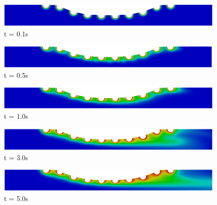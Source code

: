 \begin{figure}[H]
     \begin{minipage}{.50\linewidth}
      \centering
      \includegraphics[scale=0.18]{./02_chaps/cap_solution/figure/conc1_CurvedStrut1.png}\\
      t = 0.1s
     \end{minipage}%
     \begin{minipage}{.50\linewidth}
      \centering
      \includegraphics[scale=0.18]{./02_chaps/cap_solution/figure/conc1_CurvedStrut2.png}\\
      t = 0.5s
     \end{minipage}
     \begin{minipage}{.50\linewidth}
     \medskip
      \centering
      \includegraphics[scale=0.18]{./02_chaps/cap_solution/figure/conc1_CurvedStrut3.png}\\
      t = 1.0s
     \end{minipage}%
     \begin{minipage}{.50\linewidth}
     \medskip
      \centering
      \includegraphics[scale=0.18]{./02_chaps/cap_solution/figure/conc1_CurvedStrut4.png}\\
      t = 3.0s
     \end{minipage}
     \begin{minipage}{.50\linewidth}
      \centering
      \includegraphics[scale=0.18]{./02_chaps/cap_solution/figure/conc1_CurvedStrut5.png}\\
      t = 5.0s
     \end{minipage}%

\end{figure}
